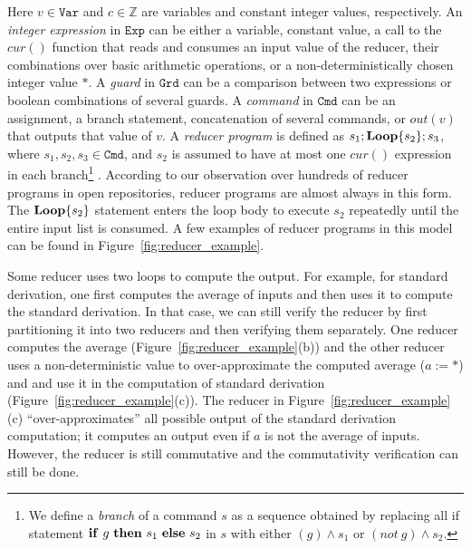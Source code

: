 \documentclass{llncs}
\newcommand{\Var}{\mathtt{Var}}
\newcommand{\Exp}{\mathtt{Exp}}
\newcommand{\Cmd}{\mathtt{Cmd}}
\newcommand{\Grd}{\mathtt{Grd}}
\newcommand{\cur}{cur()}
\newcommand{\ite}[3]{
	 \ifmmode 
	 \mathbf{if}\ #1 \ \mathbf{then}\ #2\  \mathbf{else}\ #3 
	 \else
	 \textbf{if}\ #1 \ \textbf{then}\ #2\  \textbf{else}\ #3
	 \fi}
\newcommand{\rloop}{
	\ifmmode 
	\mathbf{Loop}
	\else
	\textbf{Loop}
	\fi}
\newcommand{\Z}{\mathbb{Z}}
\begin{document}
Here $v\in \Var$ and $c \in \Z$ are variables and constant integer values, respectively. An \emph{integer expression} in $\Exp$ can be either a variable, constant value, a call to the $\cur$ function that reads and consumes an input value of the reducer, their combinations over basic arithmetic operations, or a non-deterministically chosen integer value $*$.
A \emph{guard} in $\Grd$ can be a comparison between two expressions or boolean combinations of several guards. A \emph{command} in $\Cmd$ can be an assignment, a branch statement, concatenation of several commands, or $out(v)$ that outputs that value of $v$.
A \emph{reducer program} is defined as $s_1;\rloop\{s_2\};s_3$, where $s_1,s_2,s_3 \in \Cmd$, and $s_2$ is assumed to have at most one $\cur$ expression in each branch\footnote{We define a \emph{branch} of a command $s$ as a sequence obtained by replacing all if statement $\ite{g}{s_1}{s_2}$ in $s$ with either $(g)\wedge s_1$ or $(not\ g) \wedge s_2$.} . According to our observation over hundreds  of reducer programs in open repositories, reducer programs are almost always in this form. The $\rloop\{s_2\}$ statement enters the loop body to execute $s_2$ repeatedly until the entire input list is consumed. A few examples of reducer programs in this model can be found in Figure~\ref{fig:reducer_example}. 


Some reducer uses two loops to compute the output. For example, for standard derivation, one first computes the average of inputs and then uses it to compute the standard derivation. In that case, we can still verify the reducer by first partitioning it into two reducers and then verifying them separately. One reducer computes the average (Figure~\ref{fig:reducer_example}(b)) and the other reducer uses a non-deterministic value to over-approximate the computed average ($a := *$) and and use it in the computation of standard derivation (Figure~\ref{fig:reducer_example}(c)). The reducer in Figure~\ref{fig:reducer_example}(c) ``over-approximates''  all possible output of the standard derivation computation; it computes an output even if $a$ is not the average of inputs. However, the reducer is still commutative and the commutativity verification can still be done.
\end{document}
